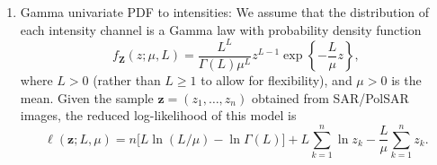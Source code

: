 \documentclass[remotesensing,article,submit,pdftex,moreauthors]{Definitions/mdpi}
\begin{document}
\begin{enumerate}[leftmargin=*,labelsep=4.9mm]
\item Gamma univariate PDF to intensities: We assume that the distribution of each intensity channel is a Gamma law with probability density function
\begin{equation}
f_{\mathbf{Z}}(z;\mu,L)=\frac{L^{L}}{\Gamma(L)\mu^{L}} z^{L-1}\exp\left\{-\frac{L}{\mu}z\right\},
\label{eq:pdfGammaUniv}
\end{equation}
where $L>0$ (rather than $L\geq 1$ to allow for flexibility), and $\mu>0$ is the mean. 	  
Given the sample $\bm z = (z_1,\dots,z_n)$ obtained from SAR/PolSAR images, the reduced log-likelihood of this model is
\begin{equation}
\ell(\bm z; L,\mu) = n \big[L\ln (L / \mu) - \ln \Gamma(L)\big]+L \sum_{k=1}^{n}\ln z_k -\frac{L}{\mu}\sum_{k=1}^{n}z_k.
\label{eq:LogLikelihoodGamma_2_param}
\end{equation}
%

\end{enumerate}
\end{document}

